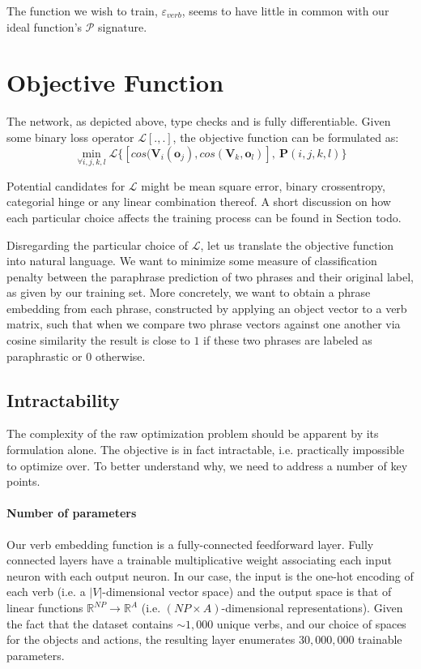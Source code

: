 \documentclass[a4paper,11pt]{article}
\newcommand{\abs}[1]{\lvert #1\rvert}
\begin{document}
The function we wish to train, $\varepsilon_{verb}$, seems to have little in common with our ideal function's $\mathcal{P}$ signature.

\section{Objective Function}
\label{sec:obj}
The network, as depicted above, type checks and is fully differentiable. Given some binary loss operator $\mathcal{L}[.,.]$, the objective function can be formulated as:
\[
\min_{\forall i,j,k,l} \mathcal{L}\{[cos(\mathbf{V}_i(\mathbf{o}_j), cos(\mathbf{V}_k,\mathbf{o}_l)], \ \mathbf{P}(i,j,k,l)\}
\]

Potential candidates for $\mathcal{L}$ might be mean square error, binary crossentropy, categorial hinge or any linear combination thereof. A short discussion on how each particular choice affects the training process can be found in Section todo.

Disregarding the particular choice of $\mathcal{L}$, let us translate the objective function into natural language. We want to minimize some measure of classification penalty between the paraphrase prediction of two phrases and their original label, as given by our training set. More concretely, we want to obtain a phrase embedding from each phrase, constructed by applying an object vector to a verb matrix, such that when we compare two phrase vectors against one another via cosine similarity the result is close to $1$ if these two phrases are labeled as paraphrastic or $0$ otherwise.

\subsection{Intractability}
The complexity of the raw optimization problem should be apparent by its formulation alone. The objective is in fact intractable, i.e. practically impossible to optimize over. To better understand why, we need to address a number of key points.

\paragraph{Number of parameters}
Our verb embedding function is a fully-connected feedforward layer. Fully connected layers have a trainable multiplicative weight associating each input neuron with each output neuron. In our case, the input is the one-hot encoding of each verb (i.e. a $\abs{V}$-dimensional vector space) and the output space is that of linear functions $\mathbb{R}^{NP} \to \mathbb{R}^{A}$ (i.e. $(NP \times A)$-dimensional representations). Given the fact that the dataset contains $\sim 1,000$ unique verbs, and our choice of spaces for the objects 
and actions, the resulting layer enumerates $30,000,000$ trainable parameters.
\end{document}
